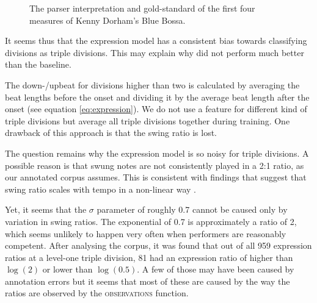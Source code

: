 \begin{figure}
\centering
{}

\caption{The parser interpretation and gold-standard of the first four measures of Kenny Dorham's Blue Bossa.}
\label{fig:blue_bossa}
\end{figure}

It seems thus that the expression model has a consistent bias towards classifying divisions as triple divisions. This may explain why did not perform much better than the baseline.

The down-/upbeat for divisions higher than two is calculated by averaging the beat lengths before the onset and dividing it by the average beat length after the onset (see equation \ref{eq:expression}). We do not use a feature for different kind of triple divisions but average all triple divisions together during training. One drawback of this approach is that the swing ratio is lost.

The question remains why the expression model is so noisy for triple divisions. A possible reason is that swung notes are not consistently played in a 2:1 ratio, as our annotated corpus assumes. This is consistent with findings that suggest that swing ratio scales with tempo in a non-linear way \citep{honing2008swing}.

Yet, it seems that the $\sigma$ parameter of roughly 0.7 cannot be caused only by variation in swing ratios. The exponential of 0.7 is approximately a ratio of 2, which seems unlikely to happen very often when performers are reasonably competent. After analysing the corpus, it was found that out of all 959 expression ratios at a level-one triple division, 81 had an expression ratio of higher than $\log(2)$ or lower than $\log(0.5)$. A few of those may have been caused by annotation errors but it seems that most of these are caused by the way the ratios are observed by the \textsc{observations} function.

